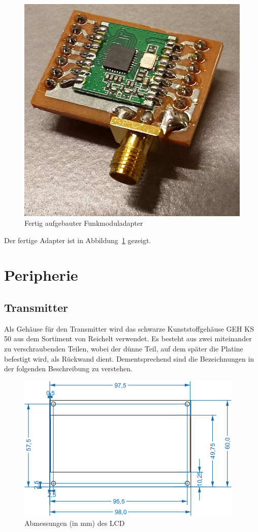\documentclass[paper=a4, parskip, numbers=noenddot, toc=listof, headsepline]{scrbook}
\begin{document}
		  \begin{figure}
			  \centering
			  \includegraphics[width=.5\textwidth]{bilder/funkmoduladapter}
			  \caption{Fertig aufgebauter Funkmoduladapter}
			  \label{fig:funkmoduladapter}
		  \end{figure}

		  Der fertige Adapter ist in Abbildung~\ref{fig:funkmoduladapter} gezeigt.

		 \section{Peripherie}

		  \subsection{Transmitter}
			  Als Gehäuse für den Transmitter wird das schwarze Kunststoffgehäuse GEH KS 50 aus dem Sortiment von Reichelt verwendet. Es besteht aus zwei miteinander zu verschraubenden Teilen, wobei der dünne Teil, auf dem später die Platine befestigt wird, als Rückwand dient. Dementsprechend sind die Bezeichnungen in der folgenden Beschreibung zu verstehen.

			  \begin{figure}
				  \centering
				  \includegraphics[]{bilder/lcddimensions}
				  \caption{Abmessungen (in mm) des LCD}
				  \label{fig:lcddimensions}
			  \end{figure}
\end{document}

